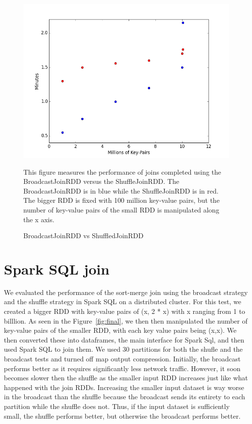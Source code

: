 \begin{figure}[h]
\begin{center}
\includegraphics[scale=0.6]{./img/rddjoin.png}
\caption{BroadcastJoinRDD vs ShuffledJoinRDD}
\label{fig:rddjoin}
\end{center}
This figure measures the performance of joins completed using the BroadcastJoinRDD versus the ShuffleJoinRDD.
The BroadcastJoinRDD is in blue while the ShuffleJoinRDD is in red. The bigger RDD is fixed with 100 million key-value pairs, but the 
number of key-value pairs of the small RDD is manipulated along the x axis.
\end{figure}

\section{Spark SQL join}
We evaluated the performance of the sort-merge join using the broadcast strategy and the shuffle strategy in Spark SQL
on a distributed cluster.
For this test, we created a bigger RDD with key-value pairs of (x, 2 * x) with x ranging from 1 to billlion.
As seen in the Figure~\ref{fig:final}, we then then manipulated the number of key-value pairs of the smaller RDD, 
with each key value pairs being (x,x). We then converted these into dataframes, the main interface for Spark Sql, and then
used Spark SQL to join them. We used 30 partitions for both the shufle and the broadcast tests and turned off map output compression.
Initially, the broadcast performs better as it requires significantly less network traffic.
However, it soon becomes slower then the shuffle as the smaller input RDD increases just like what happened with the join RDDs.
Increasing the smaller input dataset is way worse in the broadcast than the shuffle because the broadcast sends its entirety to each partition
while the shuffle does not. Thus, if the input dataset is sufficiently small, the shuffle performs better, but otherwise the broadcast performs better.

